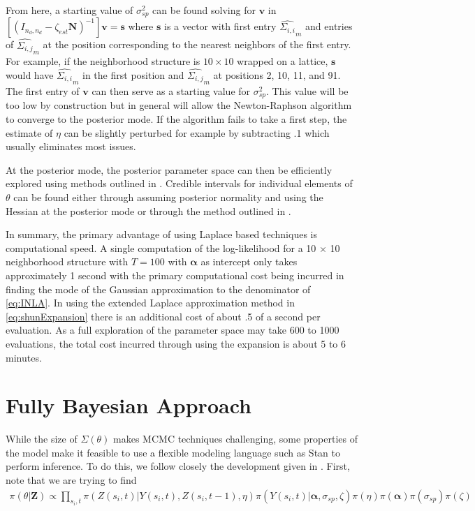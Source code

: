 \documentclass[11pt]{isuthesis}
\begin{document}
	From here, a starting value of $\sigma^2_{sp}$ can be found solving for $\boldsymbol{v}$ in $\left[(I_{{n_d},{n_d}}-\zeta_{est}\boldsymbol{N})^{-1}\right]\boldsymbol{v}=\boldsymbol{s}$ where $\boldsymbol{s}$ is a vector with first entry $\widehat{\Sigma_{i,i}}_m$ and entries of $\widehat{\Sigma_{i,j}}_m$ at the position corresponding to the nearest neighbors of the first entry.  For example, if the neighborhood structure is $10 \times 10$ wrapped on a lattice, $\boldsymbol{s}$ would have $\widehat{\Sigma_{i,i}}_m$ in the first position and $\widehat{\Sigma_{i,j}}_m$ at positions 2, 10, 11, and 91.  The first entry of $\boldsymbol{v}$ can then serve as a starting value for $\sigma^2_{sp}$. This value will be too low by construction but in general will allow the Newton-Raphson algorithm to converge to the posterior mode.  If the algorithm fails to take a first step, the estimate of $\eta$ can be slightly perturbed for example by subtracting .1 which usually eliminates most issues.
	
	At the posterior mode, the posterior parameter space can then be efficiently explored using methods outlined in \cite{rue2009approximate}.  Credible intervals for individual elements of $\theta$ can be found either through assuming posterior normality and using the Hessian at the posterior mode or through the method outlined in \cite{ferkingstad2015improving}.  
	
	In summary, the primary advantage of using Laplace based techniques is computational speed.  A single computation of the log-likelihood for a 10 $\times$ 10 neighborhood structure with $T=100$ with $\boldsymbol{\alpha}$ as intercept only takes approximately 1 second with the primary computational cost being incurred in finding the mode of the Gaussian approximation to the denominator of \eqref{eq:INLA}.  In using the extended Laplace approximation method in \eqref{eq:shunExpansion} there is an additional cost of about .5 of a second per evaluation.  As a full exploration of the parameter space may take 600 to 1000 evaluations, the total cost incurred through using the expansion is about 5 to 6 minutes.
	\section{Fully Bayesian Approach}
	
	While the size of $\Sigma(\theta)$ makes MCMC techniques challenging, some properties of the model make it feasible to use a flexible modeling language such as Stan to perform inference.  To do this, we follow closely the development given in \cite{joseph}.  First, note that we are trying to find
	\begin{align}
	\pi(\theta | \boldsymbol{Z})\propto \prod_{s_i,t} \pi(Z(s_i,t)|Y(s_i,t),Z(s_i,t-1),\eta) \pi(Y(s_i,t)|\boldsymbol{\alpha},\sigma_{sp},\zeta)\pi(\eta)\pi(\boldsymbol{\alpha})\pi(\sigma_{sp})\pi(\zeta)
	\end{align}
	
\end{document}
